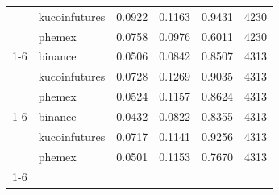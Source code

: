 \begin{tabular}{llrrrr}
 & kucoinfutures & 0.0922 & 0.1163 & 0.9431 & 4230 \\
 & phemex & 0.0758 & 0.0976 & 0.6011 & 4230 \\
\cline{1-6}
\multirow[t]{3}{*}{LINK} & binance & 0.0506 & 0.0842 & 0.8507 & 4313 \\
 & kucoinfutures & 0.0728 & 0.1269 & 0.9035 & 4313 \\
 & phemex & 0.0524 & 0.1157 & 0.8624 & 4313 \\
\cline{1-6}
\multirow[t]{3}{*}{LTC} & binance & 0.0432 & 0.0822 & 0.8355 & 4313 \\
 & kucoinfutures & 0.0717 & 0.1141 & 0.9256 & 4313 \\
 & phemex & 0.0501 & 0.1153 & 0.7670 & 4313 \\
\cline{1-6}
\bottomrule
\end{tabular}

